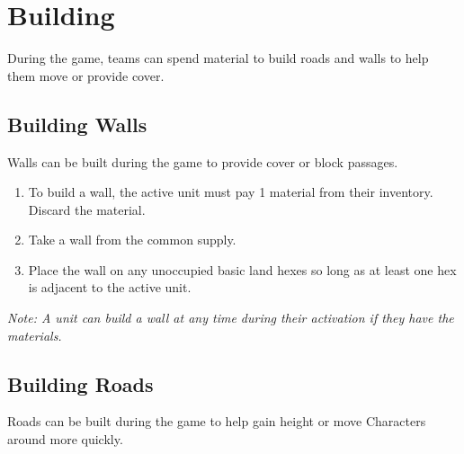 \documentclass[../main.tex]{subfiles}
\begin{document}
\section{Building}
During the game, teams can spend material to build roads and walls to help them move or provide cover.

\subsection{Building Walls}
Walls can be built during the game to provide cover or block passages.
\begin{enumerate}
    \item To build a wall, the active unit must pay 1 material from their inventory. Discard the material. 
    \item Take a wall from the common supply. 
    \item Place the wall on any unoccupied basic land hexes so long as at least one hex is adjacent to the active unit. 
\end{enumerate}

\textit{Note: A unit can build a wall at any time during their activation if they have the materials.}

\subsection{Building Roads}
Roads can be built during the game to help gain height or move Characters around more quickly.
\end{document}
